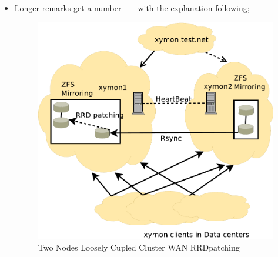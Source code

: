 \begin{itemize}
\item Longer remarks get a number --  -- with the explanation following;
\begin{figure}[H]
\caption{Two Nodes Loosely Cupled Cluster WAN RRDpatching}
\label{fig:TwoNodeLooselyCpupledClusterWAN-RRDpatching4}
\begin{center}
\includegraphics[scale=0.65]{dia/TwoNodeLooselyCpupledClusterWAN-RRDpatching.pdf}
\end{center}
\end{figure}


\end{itemize}
